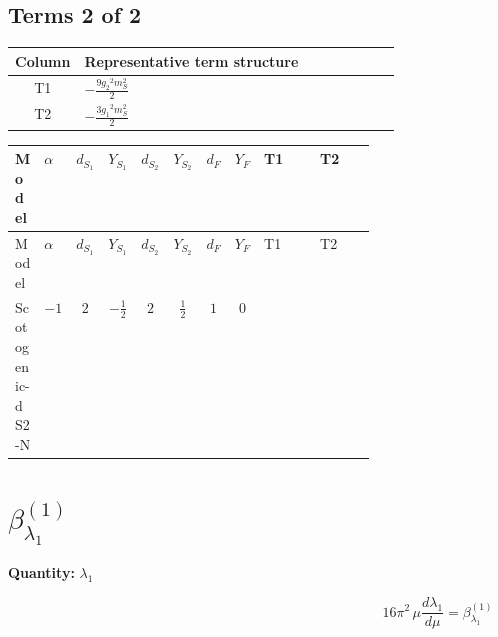 \documentclass[8pt]{article}
\begin{document}
\begin{landscape}
\subsection*{Terms 2 of 2}
\begin{center}
\begin{tabular}{@{}c >{\raggedright\arraybackslash}p{0.82\linewidth}@{}}
\toprule
Column & Representative term structure \\
\midrule
T1 & \(\displaystyle -\frac{9 {g_2}^2 {m_S^2}}{2}\) \\
\midrule
T2 & \(\displaystyle -\frac{3 {g_1}^2 {m_S^2}}{2}\) \\
\midrule
\bottomrule
\end{tabular}
\end{center}
\smallskip
\tiny
\begin{longtable}{@{}llcccccc >{\raggedright\arraybackslash}p{0.21\linewidth} >{\raggedright\arraybackslash}p{0.21\linewidth}@{}}
\toprule
Model & $\alpha$ & $d_{S_1}$ & $Y_{S_1}$ & $d_{S_2}$ & $Y_{S_2}$ & $d_F$ & $Y_F$ & T1 & T2 \\
\midrule
\endfirsthead
\toprule
Model & $\alpha$ & $d_{S_1}$ & $Y_{S_1}$ & $d_{S_2}$ & $Y_{S_2}$ & $d_F$ & $Y_F$ & T1 & T2 \\
\midrule
\endhead
Scotogenic-dS2-N & $-1$ & $2$ & $-\frac{1}{2}$ & $2$ & $\frac{1}{2}$ & $1$ & $0$ & \scriptsize\adjustbox{max width=\linewidth}{$\begin{gathered} -\frac{9 {g_2}^2 {m_S^2}}{2}\end{gathered}$} & \scriptsize\adjustbox{max width=\linewidth}{$\begin{gathered} -\frac{3 {g_1}^2 {m_S^2}}{2}\end{gathered}$} \\
\midrule
\bottomrule
\end{longtable}
\clearpage
\section*{$\beta_{\lambda_1}^{(1)}$}
\noindent\textbf{Quantity: }$\lambda_1$\par\smallskip
\[16\pi^2\,\mu\frac{d \lambda_1}{d\mu}=\beta_{\lambda_1}^{(1)}\]

\end{landscape}
\end{document}
